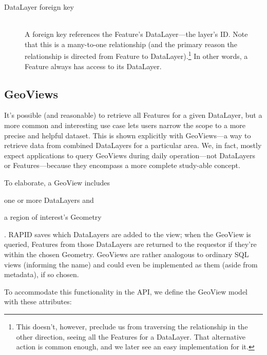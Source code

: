 \begin{description}

\item[DataLayer foreign key] \hfill \\
A foreign key references the Feature's DataLayer---the layer's ID. Note that this is a many-to-one relationship (and the primary reason the relationship is directed from Feature to DataLayer).\footnote{This doesn't, however, preclude us from traversing the relationship in the other direction, seeing all the Features for a DataLayer. That alternative action is common enough, and we later see an easy implementation for it.} In other words, a Feature always has access to its DataLayer.

\end{description}


\subsection{GeoViews}

It's possible (and reasonable) to retrieve all Features for a given DataLayer, but a more common and interesting use case lets users narrow the scope to a more precise and helpful dataset. This is shown explicitly with GeoViews---a way to retrieve data from combined DataLayers for a particular area. We, in fact, mostly expect applications to query GeoViews during daily operation---not DataLayers or Features---because they encompass a more complete study-able concept.

To elaborate, a GeoView includes 
\begin{enumerate*}[label=\itshape\alph*\upshape)]
\item one or more DataLayers and
\item a region of interest's Geometry
\end{enumerate*}. RAPID saves which DataLayers are added to the view; when the GeoView is queried, Features from those DataLayers are returned to the requestor if they're within the chosen Geometry. GeoViews are rather analogous to ordinary SQL views (informing the name) and could even be implemented as them (aside from metadata), if so chosen.

To accommodate this functionality in the API, we define the GeoView model with these attributes:

